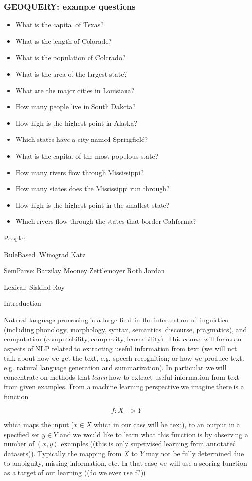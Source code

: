 \documentclass[ignorenonframetext]{beamer}
\begin{document}
\begin{frame}\frametitle{GEOQUERY: example questions}
\begin{itemize}
\item What is the capital of Texas?
\item What is the length of Colorado?
\item What is the population of Colorado?
\item What is the area of the largest state?
\item What are the major cities in Louisiana?
\item How many people live in South Dakota?
\item How high is the highest point in Alaska?
\item Which states have a city named Springfield?
\item What is the capital of the most populous state?
\item How many rivers flow through Mississippi?
\item How many states does the Mississippi run through?
\item How high is the highest point in the smallest state?
\item Which rivers flow through the states that border California?
\end{itemize}
\end{frame}

People:

RuleBased:
Winograd
Katz

SemParse:
Barzilay
Mooney
Zettlemoyer
Roth
Jordan

Lexical:
Siskind
Roy

Introduction

Natural language processing is a large field in the intersection of
linguistics (including phonology, morphology, syntax, semantics,
discourse, pragmatics), and computation (computability, complexity,
learnability).  This course will focus on aspects of NLP related to
extracting useful information from text (we will not talk about how we
get the text, e.g. speech recognition; or how we produce text,
e.g. natural language generation and summarization).  In particular we
will concentrate on methods that {\em learn} how to extract useful
information from text from given examples.  From a machine learning
perspective we imagine there is a function 

\[ f: X -> Y \]

which maps the input ($x \in X$ which in our case will be text), to an
output in a specified set $y \in Y$ and we would like to learn what
this function is by observing a number of $(x, y)$ examples ((this is
only supervised learning from annotated datasets)).  Typically the
mapping from $X$ to $Y$ may not be fully determined due to ambiguity,
missing information, etc.  In that case we will use a scoring function
as a target of our learning ((do we ever use f?))
\end{document}
